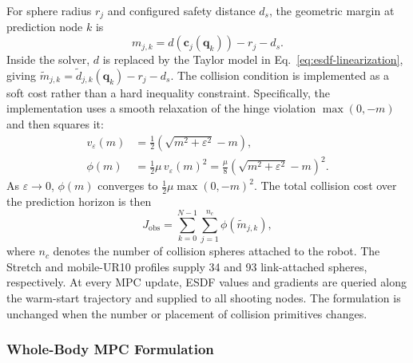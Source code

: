 \documentclass[conference]{IEEEtran}
\newcommand{\vect}[1]{\boldsymbol{#1}}
\begin{document}
For sphere radius $r_j$ and configured safety distance $d_s$, the geometric
margin at prediction node $k$ is
\begin{equation}
m_{j,k}=d\!\left(\vect{c}_j(\vect{q}_k)\right)-r_j-d_s.
\label{eq:margin}
\end{equation}
Inside the solver, $d$ is replaced by the Taylor model in
Eq.~\eqref{eq:esdf-linearization}, giving
$\widetilde m_{j,k}=\widetilde d_{j,k}(\vect{q}_k)-r_j-d_s$.  The collision
condition is implemented as a soft cost rather than a hard inequality
constraint.  Specifically, the implementation uses a smooth relaxation of the
hinge violation $\max(0,-m)$ and then squares it:
\begin{align}
v_{\varepsilon}(m)
  &=\frac{1}{2}\!\left(\sqrt{m^2+\varepsilon^2}-m\right),\\
\phi(m)
  &=\frac{1}{2}\mu\,v_{\varepsilon}(m)^2
   =\frac{\mu}{8}\!\left(\sqrt{m^2+\varepsilon^2}-m\right)^2.
\label{eq:smooth-hinge}
\end{align}
As $\varepsilon\rightarrow0$, $\phi(m)$ converges to
$\tfrac{1}{2}\mu\max(0,-m)^2$.  The total collision cost over the prediction
horizon is then
\begin{equation}
J_{\mathrm{obs}}=\sum_{k=0}^{N-1}\sum_{j=1}^{n_c}
\phi(\widetilde m_{j,k}),
\label{eq:sdf-cost}
\end{equation}
where $n_c$ denotes the number of collision spheres attached to the robot.
The Stretch and mobile-UR10 profiles supply 34 and 93 link-attached spheres,
respectively.  At every MPC update, ESDF values and gradients are queried along
the warm-start trajectory and supplied to all shooting nodes.  The formulation
is unchanged when the number or placement of collision primitives changes.

\subsubsection{Whole-Body MPC Formulation}
\end{document}
